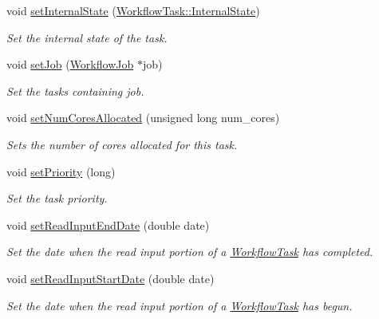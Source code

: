 \begin{DoxyCompactItemize}
void \hyperlink{classwrench_1_1_workflow_task_a6747db4a0eb51f1017f55345d7a5e2d9}{set\+Internal\+State} (\hyperlink{classwrench_1_1_workflow_task_aa2b860941b37263c26385fd076502e04}{Workflow\+Task\+::\+Internal\+State})
\begin{DoxyCompactList}\small\item\em Set the internal state of the task. \end{DoxyCompactList}\item 
void \hyperlink{classwrench_1_1_workflow_task_a394474528d099540156d756621d1050f}{set\+Job} (\hyperlink{classwrench_1_1_workflow_job}{Workflow\+Job} $\ast$job)
\begin{DoxyCompactList}\small\item\em Set the task\textquotesingle{}s containing job. \end{DoxyCompactList}\item 
void \hyperlink{classwrench_1_1_workflow_task_ab912b19f9894a4231e2eff2ad9270bc8}{set\+Num\+Cores\+Allocated} (unsigned long num\+\_\+cores)
\begin{DoxyCompactList}\small\item\em Sets the number of cores allocated for this task. \end{DoxyCompactList}\item 
void \hyperlink{classwrench_1_1_workflow_task_ae5101ae5e4e386705a549e4e91432049}{set\+Priority} (long)
\begin{DoxyCompactList}\small\item\em Set the task priority. \end{DoxyCompactList}\item 
void \hyperlink{classwrench_1_1_workflow_task_a0f71670304b0f61a860f76512f60bcc5}{set\+Read\+Input\+End\+Date} (double date)
\begin{DoxyCompactList}\small\item\em Set the date when the read input portion of a \hyperlink{classwrench_1_1_workflow_task}{Workflow\+Task} has completed. \end{DoxyCompactList}\item 
void \hyperlink{classwrench_1_1_workflow_task_a66da6332f9f636057a34448aebf017b3}{set\+Read\+Input\+Start\+Date} (double date)
\begin{DoxyCompactList}\small\item\em Set the date when the read input portion of a \hyperlink{classwrench_1_1_workflow_task}{Workflow\+Task} has begun. \end{DoxyCompactList}\item 

\end{DoxyCompactItemize}
